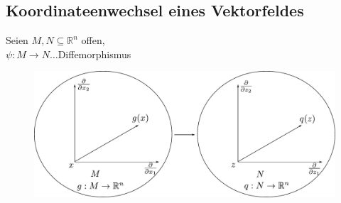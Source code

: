 \documentclass[ngerman]{tudscrreprt}
\begin{document}
\subsection{Koordinateenwechsel eines Vektorfeldes }
Seien $M, N \subseteq \mathbb{R}^n$ offen, \\ 
$\psi: M \to N\dots $Diffemorphismus 
\begin{figure}[H]
\centering
\def\svgwidth{200pt} 
  \includegraphics[width=12.5cm]{im3_12.pdf}
\end{figure}
\end{document}
